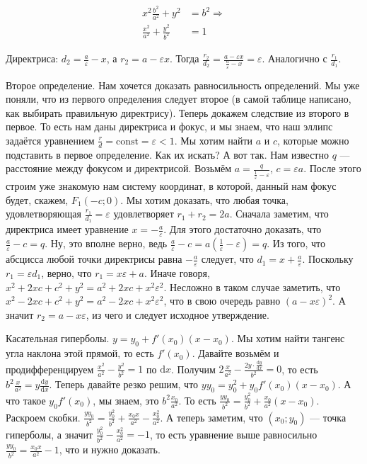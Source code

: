 \documentclass{article}
\begin{document}
\begin{itemize}
\begin{Proof}
\[\begin{split}
                x^2\frac{b^2}{a^2}+y^2&=b^2\Rightarrow\\
                \frac{x^2}{a^2}+\frac{y^2}{b^2}&=1
            \end{split}\]
            \par Директриса: $d_2=\frac a\varepsilon-x$, а $r_2=a-\varepsilon x$. Тогда $\frac{r_2}{d_2}=\frac{a-\varepsilon x}{\frac a\varepsilon-x}=\varepsilon$. Аналогично с $\frac{r_1}{d_1}$.\\
            \par Второе определение. Нам хочется доказать равносильность определений. Мы уже поняли, что из первого определения следует второе (в самой таблице написано, как выбирать правильную директрису). Теперь докажем следствие из второго в первое. То есть нам даны директриса и фокус, и мы знаем, что наш эллипс задаётся уравнением $\frac rd=\mathrm{const}=\varepsilon<1$. Мы хотим найти $a$ и $c$, которые можно подставить в первое определение. Как их искать? А вот так. Нам известно $q$ --- расстояние между фокусом и директрисой. Возьмём $a=\frac q{\frac1\varepsilon-\varepsilon}$, $c=\varepsilon a$. После этого строим уже знакомую нам систему координат, в которой, данный нам фокус будет, скажем, $F_1(-c;0)$. Мы хотим доказать, что любая точка, удовлетворяющая $\frac{r_1}{d_1}=\varepsilon$ удовлетворяет $r_1+r_2=2a$. Сначала заметим, что директриса имеет уравнение $x=-\frac a\varepsilon$. Для этого достаточно доказать, что $\frac a\varepsilon-c=q$. Ну, это вполне верно, ведь $\frac a\varepsilon-c=a\left(\frac1\varepsilon-\varepsilon\right)=q$. Из того, что абсцисса любой точки директрисы равна $-\frac a\varepsilon$ следует, что $d_1=x+\frac a\varepsilon$. Поскольку $r_1=\varepsilon d_1$, верно, что $r_1=x\varepsilon+a$. Иначе говоря, $x^2+2xc+c^2+y^2=a^2+2xc+x^2\varepsilon^2$. Несложно в таком случае заметить, что $x^2-2xc+c^2+y^2=a^2-2xc+x^2\varepsilon^2$, что в свою очередь равно $(a-x\varepsilon)^2$. А значит $r_2=a-x\varepsilon$, из чего и следует исходное утверждение.\\
            \par Касательная гиперболы. $y=y_0+f'(x_0)(x-x_0)$. Мы хотим найти тангенс угла наклона этой прямой, то есть $f'(x_0)$. Давайте возьмём и продифференцируем $\frac{x^2}{a^2}-\frac{y^2}{b^2}=1$ по $\mathrm dx$. Получим $2\frac x{a^2}-\frac{2y\cdot\frac{\mathrm dy}{\mathrm dx}}{b^2}=0$, то есть $b^2\frac x{a^2}=y\frac{\mathrm dy}{\mathrm dx}$. Теперь давайте резко решим, что $yy_0=y_0^2+y_0f'(x_0)(x-x_0)$. А что такое $y_0f'(x_0)$, мы знаем, это $b^2\frac{x_0}{a^2}$. То есть $\frac{yy_0}{b^2}=\frac{y_0^2}{b^2}+\frac{x_0}{a^2}(x-x_0)$. Раскроем скобки. $\frac{yy_0}{b^2}=\frac{y_0^2}{b^2}+\frac{x_0x}{a^2}-\frac{x_0^2}{a^2}$. А теперь заметим, что $(x_0;y_0)$ --- точка гиперболы, а значит $\frac{y_0^2}{b^2}-\frac{x_0^2}{a^2}=-1$, то есть уравнение выше равносильно $\frac{yy_0}{b^2}=\frac{x_0x}{a^2}-1$, что и нужно доказать.\\

\end{Proof}
\end{itemize}
\end{document}
